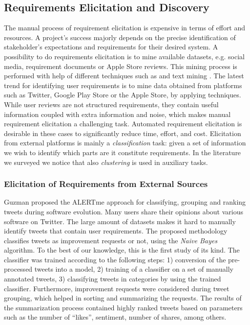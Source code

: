 \subsection{Requirements Elicitation and Discovery}

The manual process of requirement elicitation is expensive in terms of effort
and resources. A project's success majorly depends on the precise identification
of stakeholder's expectations and requirements for their desired system. A
possibility to do requirements elicitation is to mine available datasets, e.g.
social media, requirement documents or  Apple Store reviews. This mining
process is performed with help of different techniques such as \NLP and text mining
\cite{Hollis2017}\cite{dong2010}. The latest trend for identifying
user requirements is to mine data obtained from platforms such as Twitter,
Google Play Store or the Apple Store, by applying \ML techniques. While user
reviews are not structured requirements, they contain useful information
coupled with extra information and noise, which makes manual requirement
elicitation a challenging task. Automated requirement elicitation is desirable
in these cases to significantly reduce time, effort, and cost. Elicitation from
external platforms is mainly a \ML \emph{classification} task: given a set of
information we wish to identify which parts are it constitute requirements. In
the literature we surveyed we notice that also \emph{clustering} is used in
auxiliary tasks.

\subsubsection{Elicitation of Requirements from External Sources}

Guzman \etal \cite{Guzman:2017} proposed the ALERTme approach for classifying,
grouping and ranking tweets during software evolution. Many users share their
opinions about various software on Twitter. The large amount of datasets makes
it hard to manually identify tweets that contain user requirements. The proposed
methodology classifies tweets as improvement requests or not, using the
\emph{Naive Bayes} algorithm. To the best of our knowledge, this is the first
study of its kind. The classifier was trained according to the following steps:
1) conversion of the pre-processed tweets into a \VSM model, 2) training of a classifier on a set
of manually annotated tweets, 3) classifying tweets in categories by using the
trained classifier. Furthermore, improvement requests were considered during
tweet grouping, which helped in sorting and summarizing the requests. The
results of the summarization process contained highly ranked tweets based on
parameters such as the number of ``likes'', sentiment, number of shares, among
others.

